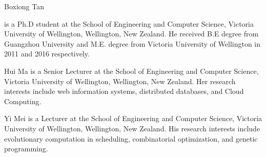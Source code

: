 \documentclass[10pt,journal,compsoc]{IEEEtran}
\begin{document}

\begin{IEEEbiography}{Boxiong Tan}

is a Ph.D student at the School of Engineering and Computer Science, Victoria University of
Wellington, Wellington, New Zealand. He received B.E degree from Guangzhou University and M.E. degree from Victoria University of
Wellington in 2011 and 2016 respectively.
\end{IEEEbiography}
\vspace{-9.5 mm}
\begin{IEEEbiography}{Hui Ma}
is a Senior Lecturer at the School of Engineering and Computer Science, Victoria University of
Wellington, Wellington, New Zealand. Her research interests include web information systems, distributed databases,
and Cloud Computing.
\end{IEEEbiography}
\vspace{-9.5 mm}
\begin{IEEEbiography}{Yi Mei}
is   a   Lecturer   at   the   School   of   Engineering  and  Computer  Science,  Victoria  University
of  Wellington,  Wellington,  New  Zealand.  His  research interests include evolutionary computation in
scheduling, combinatorial optimization, and genetic
programming. 
\end{IEEEbiography}
\end{document}
